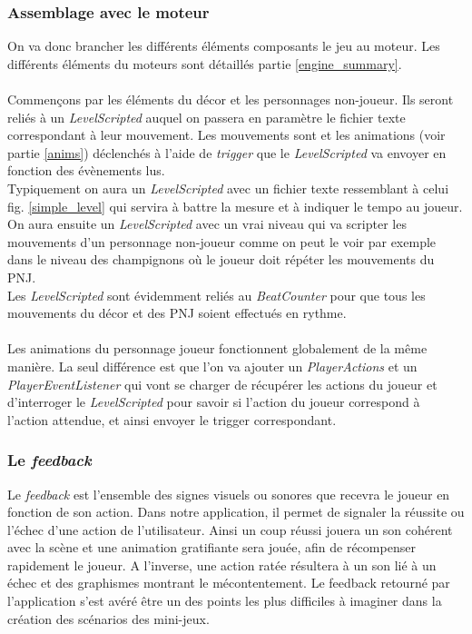\subsubsection{Assemblage avec le moteur}
On va donc brancher les différents éléments composants le jeu au moteur. Les différents éléments du moteurs sont détaillés partie \ref{engine_summary}.

\paragraph{}
Commençons par les éléments du décor et les personnages non-joueur. Ils seront reliés à un \textit{LevelScripted} auquel on passera en paramètre le fichier texte correspondant à leur mouvement. Les mouvements sont et les animations (voir partie \ref{anims}) déclenchés à l'aide de \textit{trigger} que le \textit{LevelScripted} va envoyer en fonction des évènements lus. \\
Typiquement on aura un \textit{LevelScripted} avec un fichier texte ressemblant à celui fig. \ref{simple_level} qui servira à battre la mesure et à indiquer le tempo au joueur.\\
On aura ensuite un \textit{LevelScripted} avec un vrai niveau qui va scripter les mouvements d'un personnage non-joueur comme on peut le voir par exemple dans le niveau des champignons où le joueur doit répéter les mouvements du PNJ.\\
Les \textit{LevelScripted} sont évidemment reliés au \textit{BeatCounter} pour que tous les mouvements du décor et des PNJ soient effectués en rythme.

\paragraph{}
Les animations du personnage joueur fonctionnent globalement de la même manière. La seul différence est que l'on va ajouter un \textit{PlayerActions} et un \textit{PlayerEventListener} qui vont se charger de récupérer les actions du joueur et d'interroger le \textit{LevelScripted} pour savoir si l'action du joueur correspond à l'action attendue, et ainsi envoyer le trigger correspondant. 

\subsubsection{Le \textit{feedback}}

Le \textit{feedback} est l'ensemble des signes visuels ou sonores que recevra le joueur en fonction de son action. Dans notre application, il permet de signaler la réussite ou l'échec d'une action de l'utilisateur. Ainsi un coup réussi jouera un son cohérent avec la scène et une animation gratifiante sera jouée, afin de récompenser rapidement le joueur. A l'inverse, une action ratée résultera à un son lié à un échec et des graphismes montrant le mécontentement.
Le feedback retourné par l'application s'est avéré être un des points les plus difficiles à imaginer dans la création des scénarios des mini-jeux.

